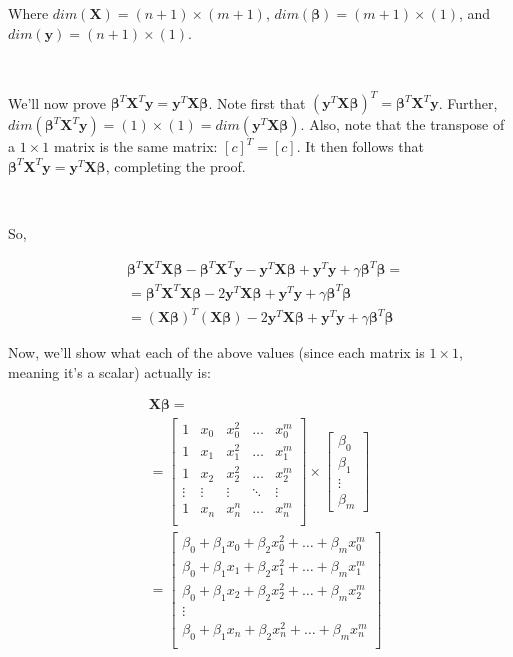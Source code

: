 \documentclass{article}
\newcommand{\y}{\mathbf{y}}
\newcommand{\X}{\mathbf{X}}
\newcommand{\B}{\boldsymbol\beta} %
\begin{document}
Where $dim(\X)=(n+1)\times(m+1)$, $dim(\B)=(m+1)\times(1)$, and $dim(\y)=(n+1)\times(1)$.

$ $ %

We'll now prove $\B^T\X^T\y = \y^T\X\B$. Note first that $(\y^T\X\B)^T=\B^T\X^T\y$. Further, $dim(\B^T\X^T\y) = (1) \times (1) = dim(\y^T\X\B)$. Also, note that the transpose of a $1 \times 1$ matrix is the same matrix: $[c]^T=[c]$. It then follows that $\B^T\X^T\y = \y^T\X\B$, completing the proof.

$ $ %

So,

\begin{equation} \label{eqn:rls_prod}
\begin{split}
    &\B^T \X^T \X\B - \B^T \X^T \y - \y^T \X\B + \y^T \y + \gamma \B^T \B = \\ 
    & = \B^T \X^T \X\B -2 \y^T \X\B + \y^T \y + \gamma \B^T \B\\
    & = (\X\B)^T(\X\B) -2 \y^T \X\B + \y^T \y + \gamma \B^T \B
\end{split}
\end{equation}

Now, we'll show what each of the above values (since each matrix is $1 \times 1$, meaning it's a scalar) actually is:

\begin{equation} \label{eqn:Ax}
\begin{split}
    & \X\B = \\
    & =
    \begin{bmatrix}
        1 & x_0 & x_0 ^2 & \ldots & x_0^m \\
        1 & x_1 & x_1 ^2 & \ldots & x_1^m \\
        1 & x_2 & x_2 ^2 & \ldots & x_2^m \\
        \vdots & \vdots & \vdots & \ddots & \vdots \\
        1 & x_n & x_n ^n & \ldots & x_n^m \\
    \end{bmatrix}
    \times
    \begin{bmatrix}
        \beta_0\\
        \beta_1\\
        \vdots\\
        \beta_m
    \end{bmatrix}\\
    & =
    \begin{bmatrix}
        \beta_0 + \beta_1 x_0 + \beta_2 x_0 ^2 + \ldots + \beta_m x_0^m \\
        \beta_0 + \beta_1 x_1 + \beta_2 x_1 ^2 + \ldots + \beta_m x_1^m \\
        \beta_0 + \beta_1 x_2 + \beta_2 x_2 ^2 + \ldots + \beta_m x_2^m \\
        \vdots \\
        \beta_0 + \beta_1 x_n + \beta_2 x_n ^2 + \ldots + \beta_m x_n^m \\
    \end{bmatrix}
\end{split}
\end{equation}
\end{document}
